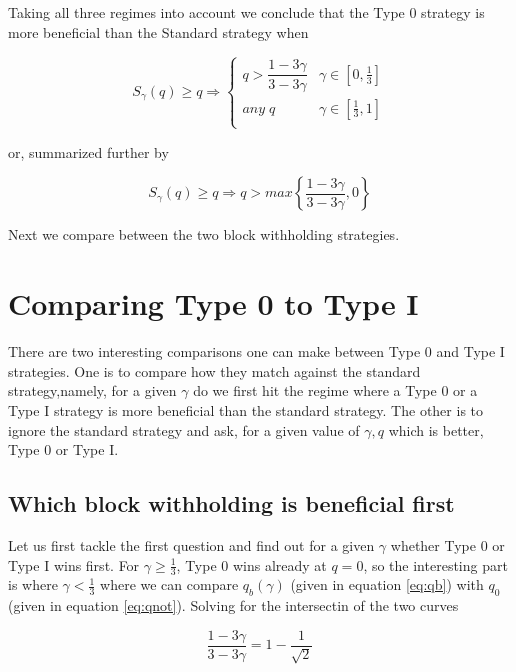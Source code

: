 \documentclass[letterpaper,12pt]{report}
\theoremstyle{plain}
\theoremstyle{definition}
\begin{document}
Taking all three regimes into account we conclude that the Type 0 strategy is more beneficial than the Standard strategy when

\begin{equation}\label{eq:0overhonest}
S_{\gamma}(q)\geq q \Longrightarrow
\begin{cases}
q>\dfrac{1-3\gamma}{3-3\gamma} & \gamma\in [0,\frac{1}{3}] \\ 
\mathit{any\;} q & \gamma\in [\frac{1}{3},1] \\ 
\end{cases}
\end{equation}

or, summarized further by 

\begin{equation}\label{eq:0overhonestsummary}
S_{\gamma}(q)\geq q \Longrightarrow
q>max\left\lbrace\dfrac{1-3\gamma}{3-3\gamma},0\right\rbrace
\end{equation}

Next we compare between the two block withholding strategies.

\section{Comparing Type 0 to Type I}

There are two interesting comparisons one can make between Type 0 and Type I strategies.
One is to compare how they match against the standard strategy,namely, for a given $\gamma$ do we first hit the regime where a Type 0 or a Type I strategy is more beneficial than the standard strategy.
The other is to ignore the standard strategy and ask, for a given value of $\gamma, q$ which is better, Type 0 or Type I.

\subsection{Which block withholding is beneficial first}
Let us first tackle the first question and find out for a given $\gamma$ whether Type 0 or Type I wins first.
For $\gamma\geq\frac{1}{3}$, Type 0 wins already at $q=0$, so the interesting part is where $\gamma < \frac{1}{3}$ where we can compare $q_b(\gamma)$ (given in equation \ref{eq:qb}) with $q_0$ (given in equation \ref{eq:qnot}). Solving for the intersectin of the two curves

\begin{equation}\label{eq:qbornot}
\dfrac{1-3\gamma}{3-3\gamma}=1-\dfrac{1}{\sqrt{2}}
\end{equation}
\end{document}
